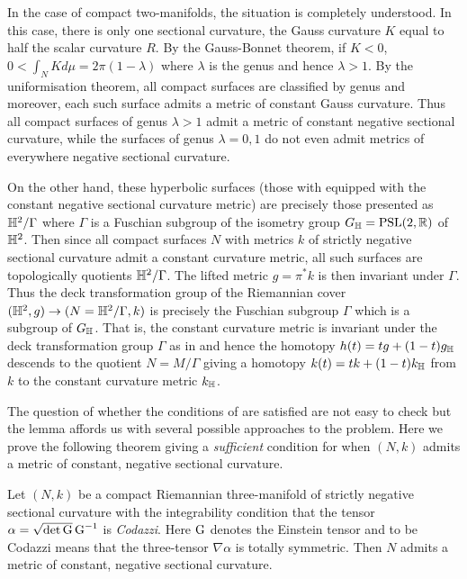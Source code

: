 \documentclass[a4paper, 12pt]{amsart}
\begin{document}
\begin{rem}
In the case of compact two-manifolds, the situation is completely understood. In this case, there is only one sectional curvature, the Gauss curvature \(K\) equal to half the scalar curvature \(R\). By the Gauss-Bonnet theorem, if \(K < 0\), \(0 < \int_N K d\mu = 2\pi(1-\lambda)\) where \(\lambda\) is the genus and hence \(\lambda > 1\). By the uniformisation theorem, all compact surfaces are classified by genus and moreover, each such surface admits a metric of constant Gauss curvature. Thus all compact surfaces of genus \(\lambda > 1\) admit a metric of constant negative sectional curvature, while the surfaces of genus \(\lambda = 0, 1\) do not even admit metrics of everywhere negative sectional curvature.

On the other hand, these hyperbolic surfaces (those with equipped with the constant negative sectional curvature metric) are precisely those presented as \(\mathbb{H}^2/\Gamma\) where \(\Gamma\) is a Fuschian subgroup of the isometry group \(G_{\mathbb{H}} = \text{PSL}(2, \mathbb{R})\) of \(\mathbb{H}^2\). Then since all compact surfaces \(N\) with metrics \(k\) of strictly negative sectional curvature admit a constant curvature metric, all such surfaces are topologically quotients \(\mathbb{H}^2/\Gamma\). The lifted metric \(g = \pi^{\ast} k\) is then invariant under \(\Gamma\). Thus the deck transformation group of the Riemannian cover \((\mathbb{H}^2, g) \to (N = \mathbb{H}^2/\Gamma, k)\) is precisely the Fuschian subgroup \(\Gamma\) which is a subgroup of \(G_{\mathbb{H}}\). That is, the constant curvature metric is invariant under the deck transformation group \(\Gamma\) as in  and hence the homotopy \(h(t) = t g + (1-t)g_{\mathbb{H}}\) descends to the quotient \(N = M/\Gamma\) giving a homotopy \(k(t) = t k + (1-t)k_{\mathbb{H}}\) from \(k\) to the constant curvature metric \(k_{\mathbb{H}}\).
\end{rem}

The question of whether the conditions of  are satisfied are not easy to check but the lemma affords us with several possible approaches to the problem. Here we prove the following theorem giving a \emph{sufficient} condition for when \((N, k)\) admits a metric of constant, negative sectional curvature.

\begin{thm}
\label{thm:intg_const_curv}
Let \((N, k)\) be a compact Riemannian three-manifold of strictly negative sectional curvature with the integrability condition that the tensor \(\alpha = \sqrt{\det \operatorname{G}} \operatorname{G}^{-1}\) is \emph{Codazzi}. Here \(\operatorname{G}\) denotes the Einstein tensor and to be Codazzi means that the three-tensor \(\nabla \alpha\) is totally symmetric. Then \(N\) admits a metric of constant, negative sectional curvature.
\end{thm}
\end{document}
